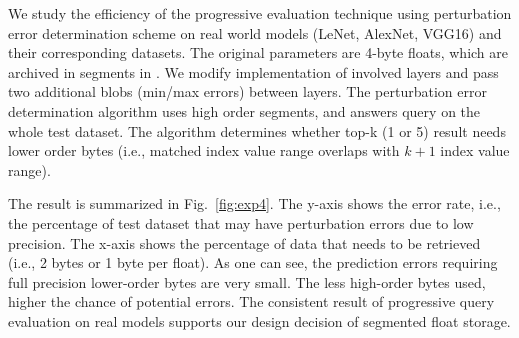 \documentclass[conference]{IEEEtran}
\begin{document}

We study the efficiency of the progressive evaluation technique using perturbation error determination scheme on real world models (LeNet, AlexNet, VGG16) and their corresponding datasets. The original parameters are 4-byte floats, which are archived in segments in \weightstore. We modify  implementation of involved layers and pass two additional blobs (min/max errors) between layers. The perturbation error determination algorithm uses high order segments, and answers  query on the whole test dataset. The algorithm determines whether top-k (1 or 5) result needs lower order bytes (i.e., matched index value range overlaps with $k+1$ index value range). %

The result is summarized in Fig.~\ref{fig:exp4}. The y-axis shows the error rate, i.e., the percentage of test dataset that may have perturbation errors due to low precision. The x-axis shows the percentage of data that needs to be retrieved (i.e., 2 bytes or 1 byte per float). As one can see, the prediction errors requiring full precision lower-order bytes are very small. The less high-order bytes used, higher the chance of potential errors. The consistent result of progressive query evaluation on real models supports our design decision of segmented float storage. 



\end{document}
